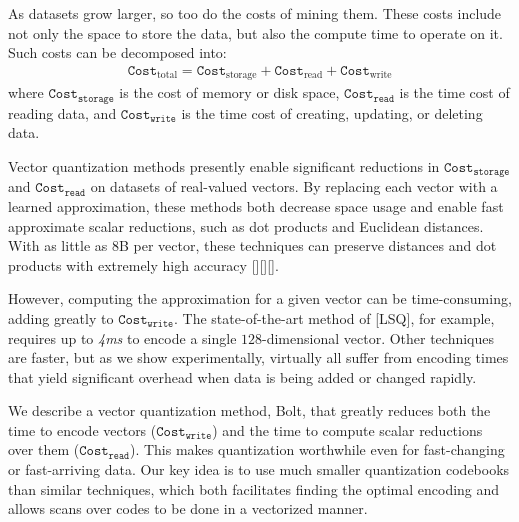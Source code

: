 

As datasets grow larger, so too do the costs of mining them. These costs include not only the space to store the data, but also the compute time to operate on it. Such costs can be decomposed into:
\begin{align}
    \texttt{Cost}_{\text{total}} = \texttt{Cost}_{\text{storage}} + \texttt{Cost}_{\text{read}} + \texttt{Cost}_{\text{write}}
\end{align}
where $\texttt{Cost}_{\texttt{storage}}$ is the cost of memory or disk space, $\texttt{Cost}_{\texttt{read}}$ is the time cost of reading data, and $\texttt{Cost}_{\texttt{write}}$ is the time cost of creating, updating, or deleting data.

Vector quantization methods presently enable significant reductions in $\texttt{Cost}_{\texttt{storage}}$ and $\texttt{Cost}_{\texttt{read}}$ on datasets of real-valued vectors. By replacing each vector with a learned approximation, these methods both decrease space usage and enable fast approximate scalar reductions, such as dot products and Euclidean distances. With as little as 8B per vector, these techniques can preserve distances and dot products with extremely high accuracy [][][].






However, computing the approximation for a given vector can be time-consuming, adding greatly to $\texttt{Cost}_{\texttt{write}}$. The state-of-the-art method of [LSQ], for example, requires up to \textit{4ms} to encode a single $128$-dimensional vector. Other techniques are faster, but as we show experimentally, virtually all suffer from encoding times that yield significant overhead when data is being added or changed rapidly.

We describe a vector quantization method, Bolt, that greatly reduces both the time to encode vectors ($\texttt{Cost}_{\texttt{write}}$) and the time to compute scalar reductions over them ($\texttt{Cost}_{\texttt{read}}$). This makes quantization worthwhile even for fast-changing or fast-arriving data. Our key idea is to use much smaller quantization codebooks than similar techniques, which both facilitates finding the optimal encoding and allows scans over codes to be done in a vectorized manner.

